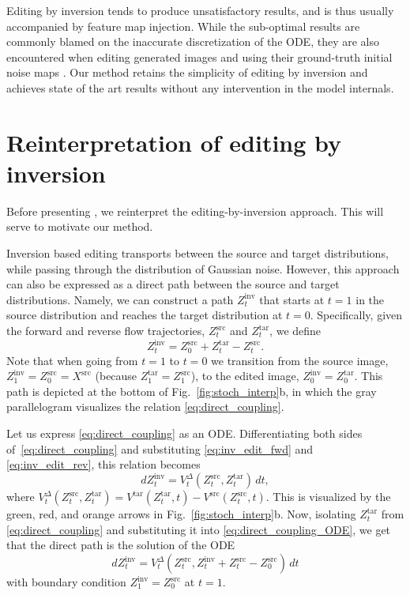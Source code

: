 Editing by inversion tends to produce unsatisfactory results, and is thus usually accompanied by feature map injection. While the sub-optimal results are commonly blamed on the inaccurate discretization of the ODE, they are also encountered when editing generated images and using their ground-truth initial noise maps \cite{huberman2024edit}. 
Our method retains the simplicity of editing by inversion and achieves state of the art results without any intervention in the model internals.

\section{Reinterpretation of editing by inversion}
\label{reinterpretation}
Before presenting \ours{}, we reinterpret the editing-by-inversion approach. This will serve to motivate our method.

Inversion based editing transports between the source and target distributions, while passing through the distribution of Gaussian noise. 
However, this approach can also be expressed as a direct path between the source and target distributions. Namely, we can construct a path $Z^{\text{inv}}_t$ that starts at $t=1$ in the source distribution and reaches the target distribution at $t=0$. 
Specifically, given the forward and reverse flow trajectories, $Z^{\text{src}}_t$ and $Z^{\text{tar}}_t$, 
we define
\begin{equation}
\label{eq:direct_coupling}
    Z^{\text{inv}}_t=Z^{\text{src}}_0+Z^{\text{tar}}_t-Z^{\text{src}}_t.
\end{equation}
Note that when going from $t=1$ to $t=0$ we transition from the source image, $Z^{\text{inv}}_1=Z^{\text{src}}_0=X^{\text{src}}$ (because $Z^{\text{tar}}_1=Z^{\text{src}}_1$), to the edited image, $Z^{\text{inv}}_0=Z^{\text{tar}}_0$. 
This path is depicted at the bottom of Fig.~\ref{fig:stoch_interp}b, in which the gray parallelogram visualizes the relation \eqref{eq:direct_coupling}. 

Let us express \eqref{eq:direct_coupling} as an ODE. Differentiating both sides of~\eqref{eq:direct_coupling} and substituting \eqref{eq:inv_edit_fwd} and \eqref{eq:inv_edit_rev}, this relation becomes
\begin{equation}
\label{eq:direct_coupling_ODE}
    dZ^{\text{inv}}_t= V^{\Delta}_{t}(Z^{\text{src}}_{t},Z^{\text{tar}}_{t})\,dt,
\end{equation}
where $V^{\Delta}_{t}(Z^{\text{src}}_{t},Z^{\text{tar}}_{t}) = V^{\text{tar}}(Z^{\text{tar}}_{t},t)-V^{\text{src}}(Z^{\text{src}}_{t},t)$. This is visualized by the green, red, and orange arrows in Fig.~\ref{fig:stoch_interp}b. Now, isolating $Z^{\text{tar}}_{t}$ from \eqref{eq:direct_coupling} and substituting it into \eqref{eq:direct_coupling_ODE}, we get that the direct path is the solution of the ODE
\begin{equation}
\label{eq:direct_coupling_ODE_combined}
    dZ^{\text{inv}}_t= V^{\Delta}_{t}(Z^{\text{src}}_{t},Z^{\text{inv}}_t+Z^{\text{src}}_t-Z^{\text{src}}_0)\,dt 
\end{equation}
with boundary condition $Z^{\text{inv}}_1=Z^{\text{src}}_0$ at $t=1$.

